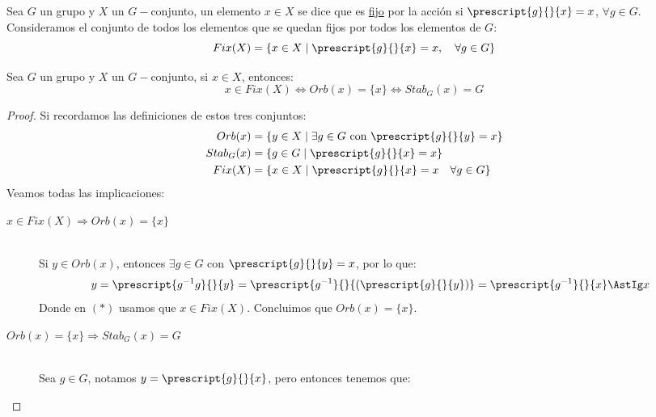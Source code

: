 \begin{definicion}
    Sea $G$ un grupo y $X$ un $G-$conjunto, un elemento $x\in X$ se dice que es \underline{fijo} por la acción si $\prescript{g}{}{x} = x$, $\forall g\in G$.\\

    \noindent
    Consideramos el conjunto de todos los elementos que se quedan fijos por todos los elementos de $G$:
    \begin{equation*}
        Fix(X) = \{x\in X \mid \prescript{g}{}{x} = x, \quad \forall g\in G\}
    \end{equation*}
\end{definicion}

\begin{prop}
    Sea $G$ un grupo y $X$ un $G-$conjunto, si $x\in X$, entonces:
    \begin{equation*}
        x\in Fix(X) \Longleftrightarrow Orb(x) = \{x\} \Longleftrightarrow Stab_G(x) = G
    \end{equation*}
    \begin{proof}
        Si recordamos las definiciones de estos tres conjuntos:
        \begin{align*}
            Orb(x) &= \{y\in X \mid \exists g\in G \text{\ con\ } \prescript{g}{}{y} = x\} \\
            Stab_G(x) &= \{g\in G \mid \prescript{g}{}{x} = x\} \\
            Fix(X) &= \{x\in X \mid \prescript{g}{}{x} = x \quad \forall g\in G\}
        \end{align*}
        Veamos todas las implicaciones:
        \begin{description}
            \item [$x\in Fix(X) \Longrightarrow Orb(x) = \{x\}$]~\\
                Si $y\in Orb(x)$, entonces $\exists g\in G$ con $\prescript{g}{}{y}= x$, por lo que:
                \begin{equation*}
                    y = \prescript{g^{-1}g}{}{y} = \prescript{g^{-1}}{}{(\prescript{g}{}{y})} = \prescript{g^{-1}}{}{x} \AstIg x
                \end{equation*}
                Donde en $(\ast)$ usamos que $x\in Fix(X)$. Concluimos que $Orb(x) = \{x\}$.
            \item [$Orb(x) = \{x\} \Longrightarrow Stab_G(x) = G$]~\\
                Sea $g\in G$, notamos $y = \prescript{g}{}{x}$, pero entonces tenemos que:

\end{description}
\end{proof}
\end{prop}
